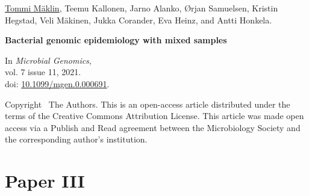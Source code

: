 \vspace{80pt}

\underline{Tommi Mäklin}, Teemu Kallonen, Jarno Alanko, Ørjan
Samuelsen, Kristin Hegstad, Veli Mäkinen, Jukka Corander, Eva Heinz,
and Antti Honkela.

\vspace{10pt}
\noindent\textbf{Bacterial genomic epidemiology with mixed samples}

\vspace{10pt}
\noindent In 
\emph{Microbial Genomics}, 
\\vol. 7 issue 11, 2021.
\\doi: \href{https://doi.org/10.1099/mgen.0.000691}{10.1099/mgen.0.000691}.

\vspace{60pt}
\noindent Copyright \textcopyright\ The Authors. This is an
open-access article distributed under the terms of the Creative
Commons Attribution License. This article was made open access via a
Publish and Read agreement between the Microbiology Society and the
corresponding author’s institution.

\newpage
\thispagestyle{empty}
\mbox{}
\newpage\cleardoublepage\cleardoublepage




\chapter*{Paper III}\thispagestyle{plain}







